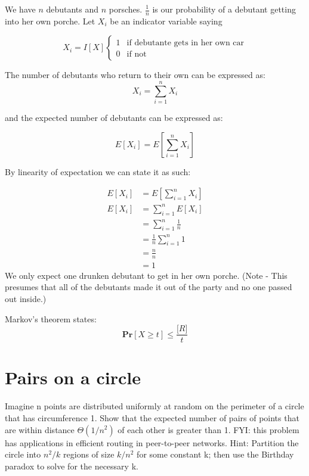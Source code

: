 \documentclass[titlepage]{article}\usepackage[]{graphicx}\usepackage[]{color}
\begin{document}
We have $n$ debutants and $n$ porsches. 
$\frac{1}{n}$ is our probability of a debutant getting into her own porche.
Let $X_i$ be an indicator variable saying 

\[
	X_i = I[X]
  \begin{cases}
   1 & \text{if debutante gets in her own car} \\
   0       & \text{if not } 
  \end{cases}
\]

The number of debutants who return to their own can be expressed as:
\[ X_i = \sum_{i=1}^n X_i \]

and the expected number of debutants can be expressed as:

\[ E [X_i] = E \left[ \sum_{i=1}^n X_i \right] \]

By linearity of expectation we can state it as such:

\begin{align*}
	E [X_i] &= E \left[ \sum_{i=1}^n X_i \right] \\
	E [X_i] &=  \sum_{i=1}^n E[X_i] \\ 
	&=  \sum_{i=1}^n \frac{1}{n} \\ 
	&=  \frac{1}{n} \sum_{i=1}^n 1 \\
	&= \frac{n}{n} \\
	& = 1
\end{align*}
We only expect one drunken debutant to get in her own porche. (Note - This presumes
that all of the debutants made it out of the party and no one passed out
inside.)


Markov's theorem states:
\[ \mathbf{Pr} \left[ X \geq t \right] \leq \frac{\mathbf[R]}{t} \]



  \section{ Pairs on a circle}
Imagine n points are distributed uniformly at random on the perimeter of a
circle that has circumference 1. Show that the expected number of pairs of
points that are within distance $\Theta(1/n^2)$ of each other is greater than 1. FYI:
this problem has applications in efficient routing in peer-to-peer networks.
Hint: Partition the circle into $n^2/k$ regions of size $k/n^2$ for some constant
k; then use the Birthday paradox to solve for the necessary k.

  
\end{document}
